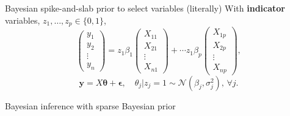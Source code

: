 \documentclass[
  ignorenonframetext,
  aspectratio=169]{beamer}
\begin{document}
\begin{frame}{Bayesian spike-and-slab prior to select variables
(literally)}
\protect\hypertarget{bayesian-spike-and-slab-prior-to-select-variables-literally}{}
With \textbf{indicator} variables,
\({z_{1},\ldots,z_{p} \in \{0, 1\}}\), \[\left(\begin{array}{l}
y_{1}\\
y_{2}\\
\vdots\\
y_{n}
\end{array}\right)
=
z_{1} \beta_{1} \left(\begin{array}{l}
X_{11}\\
X_{21}\\
\vdots\\
X_{n1}
\end{array}\right) +
\cdots
z_{1} \beta_{p} \left(\begin{array}{l}
X_{1p}\\
X_{2p}\\
\vdots\\
X_{np}
\end{array}\right),\]
\[\mathbf{y} = X \boldsymbol{\theta} + \boldsymbol{\epsilon},\quad
\theta_{j} | z_{j} = 1 \sim \mathcal{N}\!\left(\beta_{j}, \sigma_{j}^{2}\right),\, \forall j.\]

\vfill

\end{frame}

\begin{frame}{Bayesian inference with sparse Bayesian prior}
\protect\hypertarget{bayesian-inference-with-sparse-bayesian-prior}{}
\scriptsize

\normalsize

\scriptsize


\normalsize

\scriptsize


\normalsize
\end{frame}
\end{document}
